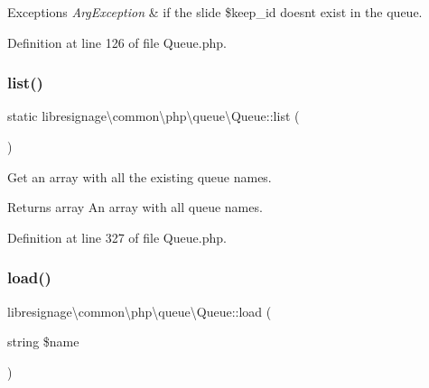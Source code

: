 \begin{DoxyExceptions}{Exceptions}
{\em Arg\+Exception} & if the slide \$keep\+\_\+id doesn\textquotesingle{}t exist in the queue. \\
\hline
\end{DoxyExceptions}


Definition at line 126 of file Queue.\+php.

\mbox{\label{classlibresignage_1_1common_1_1php_1_1queue_1_1Queue_a8514ef7ce47d8441f706f27fc3550135}} 
\subsubsection{\texorpdfstring{list()}{list()}}
{\footnotesize\ttfamily static libresignage\textbackslash{}common\textbackslash{}php\textbackslash{}queue\textbackslash{}\+Queue\+::list (\begin{DoxyParamCaption}{ }\end{DoxyParamCaption})\hspace{0.3cm}{\ttfamily [static]}}

Get an array with all the existing queue names.

\begin{DoxyReturn}{Returns}
array An array with all queue names. 
\end{DoxyReturn}


Definition at line 327 of file Queue.\+php.

\mbox{\label{classlibresignage_1_1common_1_1php_1_1queue_1_1Queue_ae1b5be576d545c15ed2d172f45975793}} 
\subsubsection{\texorpdfstring{load()}{load()}}
{\footnotesize\ttfamily libresignage\textbackslash{}common\textbackslash{}php\textbackslash{}queue\textbackslash{}\+Queue\+::load (\begin{DoxyParamCaption}\item[{string}]{\$name }\end{DoxyParamCaption})}



